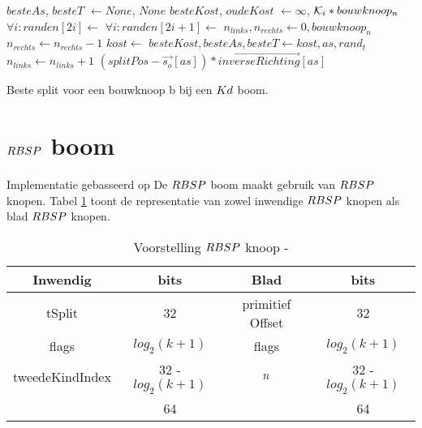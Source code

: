 \begin{dutchalgorithm}
    \begin{algorithmic}       
            \State $besteAs$, $besteT$ $\gets None$, $None$
            \State $besteKost$, $oudeKost$ $\gets \infty$, $\mathcal{K}_i * bouwknoop_n$
                \State $\forall i: randen[2i]\gets$ 
                \State $\forall i: randen[2i+1]\gets$ 
                \State {}
                \State $n_{links}, n_{rechts} \gets 0, bouwknoop_n$
                        \State $n_{rechts} \gets n_{rechts} - 1$
                    \EndIf
                    \State $kost \gets$ 
                        \State $besteKost, besteAs, besteT \gets kost, as, rand_t$
                    \EndIf
                        \State $n_{links} \gets n_{links} + 1$
                    \EndIf
                \EndFor                
            \EndFor
            \State \Return $(splitPos - \vec{s_o}[as]) * \vec{inverseRichting}[as]$
        \EndFunction
    \end{algorithmic}
    \caption{Beste split voor een bouwknoop b bij een $Kd$ boom.}
    \label{alg:kd-beste-split}
\end{dutchalgorithm}



\section{$\symRBSP$ boom}
\label{sec:h4-rbsp}
Implementatie gebasseerd op 
De $\symRBSP$ boom maakt gebruik van $\symRBSP$ knopen. 
Tabel \ref{tab:voorstelling-rbsp-knoop} toont de representatie van zowel inwendige $\symRBSP$ knopen als blad $\symRBSP$ knopen.
\begin{table}
        \centering
        \begin{tabular}{@{}|c|c|c|c|@{}} \toprule      
        Inwendig & bits & Blad & bits \\ \midrule
        tSplit & 32 & primitief Offset & 32 \\
        flags  & $log_2(k + 1)$  &  flags   & $log_2(k + 1)$   \\
        tweedeKindIndex & 32 - $log_2(k + 1)$ & $n$ & 32 - $log_2(k + 1)$ \\ \hline \hline
        & 64 & & 64    \\ \bottomrule
        \end{tabular}
    \caption[Voorstelling $\symRBSP$ knoop]{Voorstelling $\symRBSP$ knoop - \small }
    \label{tab:voorstelling-rbsp-knoop}    
\end{table}   

